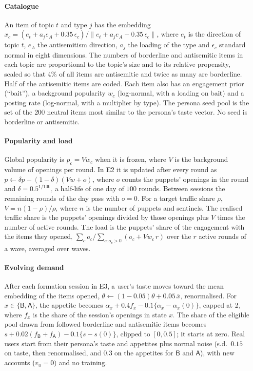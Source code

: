 \paragraph{Catalogue} An item of topic $t$ and type $j$ has the embedding $x_c=(e_t+a_j e_A+0.35\,\epsilon_c)/\|e_t+a_je_A+0.35\,\epsilon_c\|$, where $e_t$ is the direction of topic $t$, $e_A$ the antisemitism direction, $a_j$ the loading of the type and $\epsilon_c$ standard normal in eight dimensions. The numbers of borderline and antisemitic items in each topic are proportional to the topic's size and to its relative propensity, scaled so that $4\%$ of all items are antisemitic and twice as many are borderline. Half of the antisemitic items are coded. Each item also has an engagement prior (``bait''), a background popularity $w_c$ (log-normal, with a loading on bait) and a posting rate (log-normal, with a multiplier by type). The persona seed pool is the set of the $200$ neutral items most similar to the persona's taste vector. No seed is borderline or antisemitic.

\paragraph{Popularity and load} Global popularity is $p_c=Vw_c$ when it is frozen, where $V$ is the background volume of openings per round. In E2 it is updated after every round as $p\leftarrow\delta p+(1-\delta)(Vw+o)$, where $o$ counts the puppets' openings in the round and $\delta=0.5^{1/100}$, a half-life of one day of $100$ rounds. Between sessions the remaining rounds of the day pass with $o=0$. For a target traffic share $\rho$, $V=n(1-\rho)/\rho$, where $n$ is the number of puppets and sentinels. The realised traffic share is the puppets' openings divided by those openings plus $V$ times the number of active rounds. The load is the puppets' share of the engagement with the items they opened, $\sum_co_c/\sum_{c:o_c>0}(o_c+Vw_c\,r)$ over the $r$ active rounds of a wave, averaged over waves.

\paragraph{Evolving demand} After each formation session in E3, a user's taste moves toward the mean embedding of the items opened, $\theta\leftarrow(1-0.05)\theta+0.05\,\bar x$, renormalised. For $x\in\{\mathsf B,\mathsf A\}$, the appetite becomes $\alpha_x+0.4f_x-0.1\{\alpha_x-\alpha_x(0)\}$, capped at $2$, where $f_x$ is the share of the session's openings in state $x$. The share of the eligible pool drawn from followed borderline and antisemitic items becomes $s+0.02(f_{\mathsf B}+f_{\mathsf A})-0.1\{s-s(0)\}$, clipped to $[0,0.5]$; it starts at zero. Real users start from their persona's taste and appetites plus normal noise (s.d.\ $0.15$ on taste, then renormalised, and $0.3$ on the appetites for $\mathsf B$ and $\mathsf A$), with new accounts ($v_u=0$) and no training.

